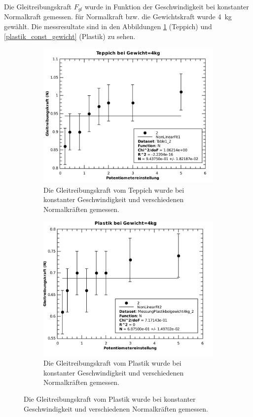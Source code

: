 Die  Gleitreibungskraft  $F_{gl}$  wurde  in  Funktion  der  Geschwindigkeit bei
konstanter Normalkraft gemessen. f\"ur Normalkraft  bzw. die Gewichtskraft wurde
\SI{4}{\kilo\gram}  gew\"ahlt.   Die   messresultate  sind  in  den  Abbildungen
\ref{fig:teppich_const_gewicht}    (Teppich)   und   \ref{plastik_const_gewicht}
(Plastik) zu sehen.

\begin{figure}[H]
    \centering
    \begin{subfigure}{.7\textwidth}
        \includegraphics[width=\linewidth]{images/teppich_const_gewicht}
        \caption{Die Gleitreibungskraft vom Teppich wurde bei konstanter Geschwindigkeit und verschiedenen Normalkr\"aften gemessen.}
        \label{fig:teppich_const_gewicht}
    \end{subfigure}
    \begin{subfigure}{.7\textwidth}
        \includegraphics[width=\linewidth]{images/plastik_const_gewicht}
        \caption{Die Gleitreibungskraft vom Plastik wurde bei konstanter Geschwindigkeit und verschiedenen Normalkr\"aften gemessen.}
        \label{fig:plastik_const_gewicht}
    \end{subfigure}
\end{figure}


